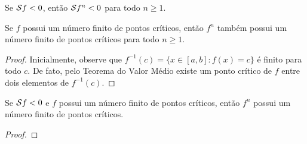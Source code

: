 \begin{corollary}
Se  $\mathcal{S} f < 0$, então $\mathcal{S} f^n < 0$ para todo $n \geq 1$.
\end{corollary}

\begin{lemma}
Se $f$ possui um número finito de pontos críticos, então $f^n$ também possui um número finito de pontos críticos para todo $n \geq 1$.
\end{lemma}
\begin{proof}
Inicialmente, observe que $f^{-1}(c) = \{ x \in [a,b] : f(x) = c \}$ é finito para todo $c$. De fato, pelo Teorema do Valor Médio existe um ponto crítico de $f$ entre dois elementos de $f^{-1}(c)$.


\end{proof}

\begin{lemma}
Se $\mathcal{S} f < 0$ e $f$ possui um número finito de pontos críticos, então $f^n$ possui um número finito de pontos críticos.
\end{lemma}
\begin{proof}
\end{proof}